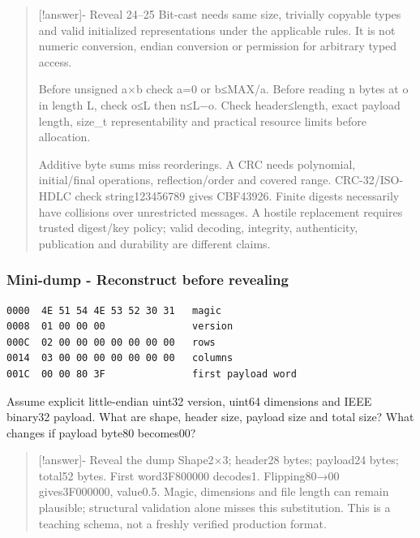 \begin{quote}
{[}!answer{]}- Reveal 24--25 Bit-cast needs same size, trivially copyable types and valid initialized representations under the applicable rules. It is not numeric conversion, endian conversion or permission for arbitrary typed access.

Before unsigned a×b check a=0 or b≤MAX/a. Before reading n bytes at o in length L, check o≤L then n≤L−o. Check header≤length, exact payload length, size\_t representability and practical resource limits before allocation.

Additive byte sums miss reorderings. A CRC needs polynomial, initial/final operations, reflection/order and covered range. CRC-32/ISO-HDLC check string123456789 gives CBF43926. Finite digests necessarily have collisions over unrestricted messages. A hostile replacement requires trusted digest/key policy; valid decoding, integrity, authenticity, publication and durability are different claims.
\end{quote}

\subsubsection{Mini-dump - Reconstruct before revealing}\label{appendix-ef4d27797a92-mini-dump---reconstruct-before-revealing}

\hypertarget{appendix-ef4d27797a92-mini-dump---reconstruct-before-revealing}{}

\begin{verbatim}
0000  4E 51 54 4E 53 52 30 31   magic
0008  01 00 00 00               version
000C  02 00 00 00 00 00 00 00   rows
0014  03 00 00 00 00 00 00 00   columns
001C  00 00 80 3F               first payload word
\end{verbatim}

Assume explicit little-endian uint32 version, uint64 dimensions and IEEE binary32 payload. What are shape, header size, payload size and total size? What changes if payload byte80 becomes00?

\begin{quote}
{[}!answer{]}- Reveal the dump Shape2×3; header28 bytes; payload24 bytes; total52 bytes. First word3F800000 decodes1. Flipping80→00 gives3F000000, value0.5. Magic, dimensions and file length can remain plausible; structural validation alone misses this substitution. This is a teaching schema, not a freshly verified production format.
\end{quote}

